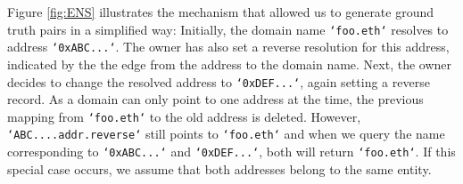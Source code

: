 \documentclass[12pt,a4paper,titlepage,oneside,english]{article}
\begin{document}
Figure \ref{fig:ENS} illustrates the mechanism that allowed us to generate ground truth pairs in a simplified way: Initially, the domain name \texttt{`foo.eth`} resolves to address \texttt{`0xABC...`}. The owner has also set a reverse resolution for this address, indicated by the the edge from the address to the domain name. Next, the owner decides to change the resolved address to \texttt{`0xDEF...`}, again setting a reverse record.  As a domain can only point to one address at the time, the previous mapping from \texttt{`foo.eth`} to the old address is deleted. However, \texttt{`ABC....addr.reverse`} still points to \texttt{`foo.eth`} and when we query the name corresponding to \texttt{`0xABC...`} and \texttt{`0xDEF...`}, both will return \texttt{`foo.eth`}.
If this special case occurs, we assume that both addresses belong to the same entity.

\begin{figure*}[h!]
	\begin{center}
		\caption{Changing the record to another address does not change the old reverse resolution (Simplified Schematic Representation)}
		\label{fig:ENS}
	\end{center}
\end{figure*}
\end{document}
